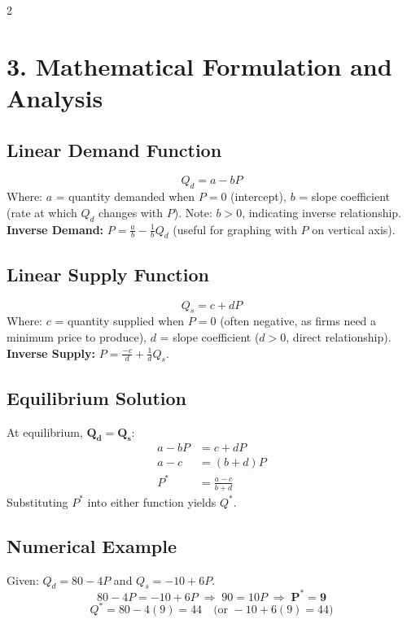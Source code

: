 \documentclass[10pt,a4paper]{article}
\begin{document}
\begin{multicols}{2}
\section*{3. Mathematical Formulation and Analysis}

\subsection*{Linear Demand Function}
\[
Q_d = a - bP
\]
Where: $a$ = quantity demanded when $P=0$ (intercept), $b$ = slope coefficient (rate at which $Q_d$ changes with $P$). Note: $b > 0$, indicating inverse relationship. \textbf{Inverse Demand:} $P = \frac{a}{b} - \frac{1}{b}Q_d$ (useful for graphing with $P$ on vertical axis).

\subsection*{Linear Supply Function}
\[
Q_s = c + dP
\]
Where: $c$ = quantity supplied when $P=0$ (often negative, as firms need a minimum price to produce), $d$ = slope coefficient ($d > 0$, direct relationship). \textbf{Inverse Supply:} $P = \frac{-c}{d} + \frac{1}{d}Q_s$.

\subsection*{Equilibrium Solution}
At equilibrium, $\mathbf{Q_d = Q_s}$:
\begin{align*}
a - bP &= c + dP \\
a - c &= (b + d)P \\
P^* &= \frac{a - c}{b + d}
\end{align*}
Substituting $P^*$ into either function yields $Q^*$.

\subsection*{Numerical Example}
Given: $Q_d = 80 - 4P$ and $Q_s = -10 + 6P$.
\[
80 - 4P = -10 + 6P \;\Rightarrow\; 90 = 10P \;\Rightarrow\; \mathbf{P^* = 9}
\]
\[
Q^* = 80 - 4(9) = 44 \quad \text{(or } -10 + 6(9) = 44\text{)}
\]


\end{multicols}
\end{document}
